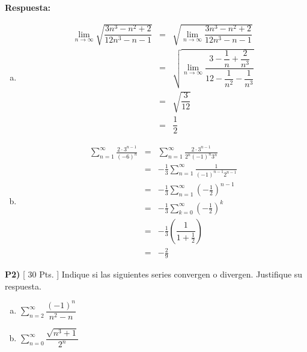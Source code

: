 \documentclass{article}
\begin{document}
\vspace{5mm}
\noindent\textbf{Respuesta:} 
\begin{enumerate}[a)]
  \item 
    \begin{eqnarray*}
      \lim_{n\to\infty}\sqrt{\dfrac{3n^3-n^2+2}{12n^3-n-1}} 
        &=& \sqrt{\lim_{n\to\infty}\dfrac{3n^3-n^2+2}{12n^3-n-1}} \\
        &=& \sqrt{\lim_{n\to\infty}\dfrac{3-\dfrac{1}{n}+\dfrac{2}{n^3}}{12-\dfrac{1}{n^2}-\dfrac{1}{n^3}}} \\
        &=& \sqrt{\dfrac{3}{12}}\\
        &=& \dfrac{1}{2}
    \end{eqnarray*}
  \item
    \begin{eqnarray*}
      \sum_{n=1}^{\infty} \frac{2\cdot 3^{n-1}}{(-6)^n} 
        &=& \sum_{n=1}^{\infty} \frac{2\cdot3^{n-1}}{2^n(-1)^n3^n}\\
        &=& -\frac{1}{3}\sum_{n=1}^{\infty} \frac{1}{(-1)^{n-1}2^{n-1}}\\
        &=& -\frac{1}{3}\sum_{n=1}^{\infty} \left(-\frac{1}{2}\right)^{n-1}\\
        &=& -\frac{1}{3}\sum_{k=0}^{\infty} \left(-\frac{1}{2}\right)^{k}\\
        &=& -\frac{1}{3}\left(\dfrac{1}{1+\frac{1}{2}}\right)\\
        &=& -\frac{2}{9}
    \end{eqnarray*}
\end{enumerate}


\newpage
\noindent\textbf{P2) } \textsf{[ 30 Pts. ] } Indique si las siguientes series convergen o divergen. Justifique su respuesta.
\begin{enumerate}[a)]
  \item $\displaystyle\sum_{n=2}^{\infty}\dfrac{(-1)^n}{n^2-n}$
  \item $\displaystyle\sum_{n=0}^{\infty}\dfrac{\sqrt{n^3+1}}{2^n}$
\end{enumerate}
\end{document}

